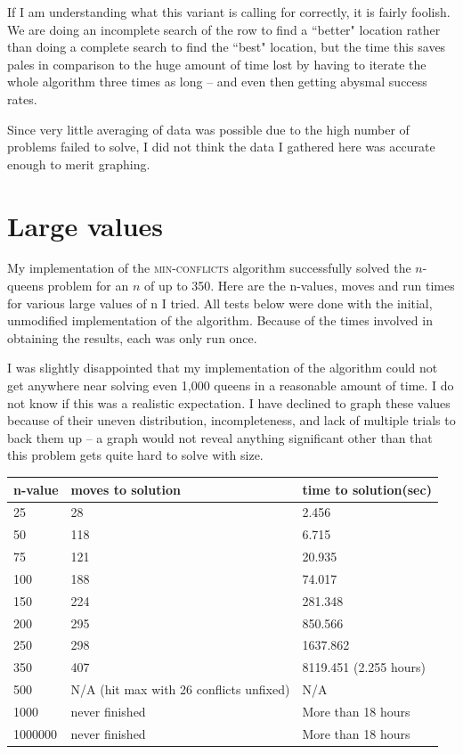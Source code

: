 \documentclass{article}
\begin{document}
\begin{doublespace}
If I am understanding what this variant is calling for correctly, it is fairly foolish. We are doing an incomplete search of the row to find a ``better" location rather than doing a complete search to find the ``best" location, but the time this saves pales in comparison to the huge amount of time lost by having to iterate the whole algorithm three times as long -- and even then getting abysmal success rates.

Since very little averaging of data was possible due to the high number of problems failed to solve, I did not think the data I gathered here was accurate enough to merit graphing.


\section{Large values}
My implementation of the \textsc{min-conflicts} algorithm successfully solved the $n$-queens problem for an $n$ of up to 350. Here are the n-values, moves and run times for various large values of n I tried. All tests below were done with the initial, unmodified implementation of the algorithm. Because of the times involved in obtaining the results, each was only run once.

I was slightly disappointed that my implementation of the algorithm could not get anywhere near solving even 1,000 queens in a reasonable amount of time. I do not know if this was a realistic expectation. I have declined to graph these values because of their uneven distribution, incompleteness, and lack of multiple trials to back them up -- a graph would not reveal anything significant other than that this problem gets quite hard to solve with size.\\

\begin{center}
\begin{tabular}{|l | l | l|}
\hline
	n-value & moves to solution & time to solution(sec) \\ \hline
	25 & 28 & 2.456 \\ \hline
	50 & 118 & 6.715 \\ \hline
	75 & 121 & 20.935 \\ \hline
	100 & 188 & 74.017 \\ \hline
	150 & 224 & 281.348 \\ \hline
	200 & 295 & 850.566 \\ \hline
	250 & 298 & 1637.862 \\ \hline
	350 & 407 & 8119.451 (2.255 hours) \\ \hline
	500 & N/A (hit max with 26 conflicts unfixed) & N/A \\ \hline
	1000 & never finished & More than 18 hours \\ \hline
	1000000 & never finished & More than 18 hours \\
\hline
\end{tabular}
\end{center}


\end{doublespace}
\end{document}
